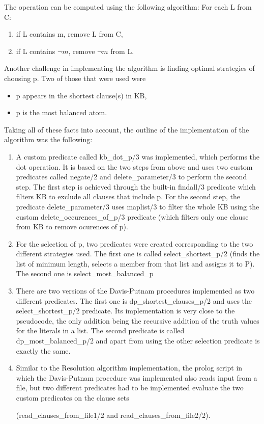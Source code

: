 \documentclass{article}
\begin{document}
The operation can be computed using the following algorithm: For each L from C:
\begin{enumerate}
	\item if L contains m, remove L from C,
	\item if L contains $\neg m$, remove $\neg m$ from L.
\end{enumerate}

Another challenge in implementing the algorithm is finding optimal strategies of choosing p. Two of those that were used were
\begin{itemize}
	\item p appears in the shortest clause(s) in KB,
	\item p is the most balanced atom.
\end{itemize}

Taking all of these facts into account, the outline of the implementation of the algorithm was the following:
\begin{enumerate}
	\item A custom predicate called kb\_dot\_p/3 was implemented, which performs the dot operation. It is based on the two steps from above and uses two custom predicates called negate/2 and delete\_parameter/3 to perform the second step. The first step is achieved through the built-in findall/3\cite{findallpred} predicate which filters KB to exclude all clauses that include p. For the second step, the predicate delete\_parameter/3 uses maplist/3\cite{maplistpred} to filter the whole KB using the custom delete\_occurences\_of\_p/3 predicate (which filters only one clause from KB to remove ocurences of p).
	\item For the selection of p, two predicates were created corresponding to the two different strategies used. The first one is called select\_shortest\_p/2 (finds the list of minimum length, selects a member from that list and assigns it to P). The second one is select\_most\_balanced\_p 
	\item There are two versions of the Davis-Putnam procedures implemented as two different predicates. The first one is dp\_shortest\_clauses\_p/2 and uses the select\_shortest\_p/2 predicate. Its implementation is very close to the pseudocode, the only addition being the recursive addition of the truth values for the literals in a list. The second predicate is called dp\_most\_balanced\_p/2 and apart from using the other selection predicate is exactly the same.
	\item Similar to the Resolution algorithm implementation, the prolog script in which the Davis-Putnam procedure was implemented also reads input from a file, but two different predicates had to be implemented evaluate the two custom predicates on the clause sets 
	
	(read\_clauses\_from\_file1/2 and read\_clauses\_from\_file2/2).
\end{enumerate}
\end{document}
